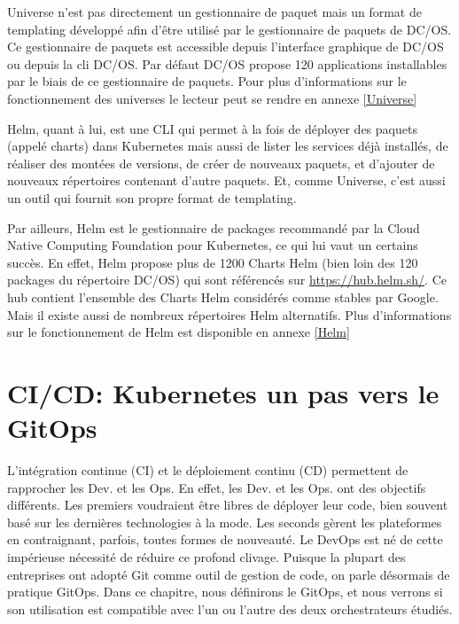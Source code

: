 \documentclass[11pt,fleqn]{book} %
\begin{document}
Universe n'est pas directement un gestionnaire de paquet mais un format de templating développé afin d'être utilisé par le gestionnaire de paquets de DC/OS. Ce gestionnaire de paquets est accessible depuis l'interface graphique de DC/OS ou depuis la cli DC/OS. Par défaut DC/OS propose 120 applications installables par le biais de ce gestionnaire de paquets. Pour plus d'informations sur le fonctionnement des universes le lecteur peut se rendre en annexe \ref{Universe} \newline 

Helm, quant à lui, est une CLI qui permet à la fois de déployer des paquets (appelé charts) dans Kubernetes mais aussi de lister les services déjà installés, de réaliser des montées de versions, de créer de nouveaux paquets, et d'ajouter de nouveaux répertoires contenant d'autre paquets. Et, comme Universe, c'est aussi un outil qui fournit son propre format de templating.\newline

Par ailleurs, Helm est le gestionnaire de packages recommandé par la Cloud Native Computing Foundation pour Kubernetes, ce qui lui vaut un certains succès. En effet, Helm propose plus de 1200 Charts Helm (bien loin des 120 packages du répertoire DC/OS) qui sont référencés sur \url{https://hub.helm.sh/}. Ce hub contient l'ensemble des Charts Helm considérés comme stables par Google. Mais il existe aussi de nombreux répertoires Helm alternatifs. Plus d'informations sur le fonctionnement de Helm est disponible en annexe \ref{Helm}\newline








\chapter{CI/CD: Kubernetes un pas vers le GitOps}
\vspace{-2cm}
L'intégration continue (CI) et le déploiement continu (CD) permettent de rapprocher les Dev. et les Ops. En effet, les Dev. et les Ops. ont des objectifs différents. Les premiers voudraient être libres de déployer leur code, bien souvent basé sur les dernières technologies à la mode. Les seconds gèrent les plateformes en contraignant, parfois, toutes formes de nouveauté. Le DevOps est né de cette impérieuse nécessité de réduire ce profond clivage. Puisque la plupart des entreprises ont adopté Git comme outil de gestion de code, on parle désormais de pratique GitOps. Dans ce chapitre, nous définirons le GitOps, et nous verrons si son utilisation est compatible avec l'un ou l'autre des deux orchestrateurs étudiés.
\end{document}
